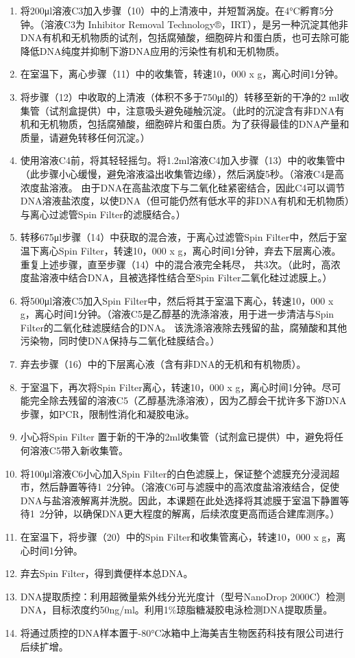 \begin{enumerate}
      \item 将200μl溶液C3加入步骤（10）中的上清液中，并短暂涡旋。在4°C孵育5分钟。（溶液C3为 Inhibitor Removal Technology®，IRT），是另一种沉淀其他非DNA有机和无机物质的试剂，包括腐殖酸，细胞碎片和蛋白质，也可去除可能降低DNA纯度并抑制下游DNA应用的污染性有机和无机物质。
      \item 在室温下，离心步骤（11）中的收集管，转速10，000 x g，离心时间1分钟。
      \item 将步骤（12）中收取的上清液（体积不多于750μl的）转移至新的干净的2 ml收集管（试剂盒提供）中，注意吸头避免碰触沉淀。（此时的沉淀含有非DNA有机和无机物质，包括腐殖酸，细胞碎片和蛋白质。为了获得最佳的DNA产量和质量，请避免转移任何沉淀。）
      \item 使用溶液C4前，将其轻轻摇匀。将1.2ml溶液C4加入步骤（13）中的收集管中（此步骤小心缓慢，避免溶液溢出收集管边缘），然后涡旋5秒。（溶液C4是高浓度盐溶液。 由于DNA在高盐浓度下与二氧化硅紧密结合，因此C4可以调节DNA溶液盐浓度，以使DNA（但可能仍然有低水平的非DNA有机和无机物质）与离心过滤管Spin Filter的滤膜结合。）
      \item 转移675μl步骤（14）中获取的混合液，于离心过滤管Spin Filter中，然后于室温下离心Spin Filter，转速10，000 x g，离心时间1分钟，弃去下层离心液。重复上述步骤，直至步骤（14）中的混合液完全耗尽， 共3次。（此时，高浓度盐溶液中结合DNA，且被选择性结合至Spin Filter二氧化硅过滤膜上。）
      \item 将500μl溶液C5加入Spin Filter中，然后将其于室温下离心，转速10，000 x g，离心时间1分钟。（溶液C5是乙醇基的洗涤溶液，用于进一步清洁与Spin Filter的二氧化硅滤膜结合的DNA。 该洗涤溶液除去残留的盐，腐殖酸和其他污染物，同时使DNA保持与二氧化硅膜结合。）
      \item 弃去步骤（16）中的下层离心液（含有非DNA的无机和有机物质）。
      \item 于室温下，再次将Spin Filter离心，转速10，000 x g，离心时间1分钟。尽可能完全除去残留的溶液C5（乙醇基洗涤溶液），因为乙醇会干扰许多下游DNA步骤，如PCR，限制性消化和凝胶电泳。
      \item 小心将Spin Filter 置于新的干净的2ml收集管（试剂盒已提供）中，避免将任何溶液C5带入新收集管。
      \item 将100μl溶液C6小心加入Spin Filter的白色滤膜上，保证整个滤膜充分浸润超市，然后静置等待1~2分钟。（溶液C6可与滤膜中的高浓度盐溶液结合，促使DNA与盐溶液解离并洗脱。因此，本课题在此处选择将其滤膜于室温下静置等待1~2分钟，以确保DNA更大程度的解离，后续浓度更高而适合建库测序。）
      \item 在室温下，将步骤（20）中的Spin Filter和收集管离心，转速10，000 x g，离心时间1分钟。
      \item 弃去Spin Filter，得到粪便样本总DNA。
      \item DNA提取质控：利用超微量紫外线分光光度计（型号NanoDrop 2000C）检测DNA，目标浓度约50ng/ml。利用1\%琼脂糖凝胶电泳检测DNA提取质量。
      \item 将通过质控的DNA样本置于-80°C冰箱中上海美吉生物医药科技有限公司进行后续扩增。
    \end{enumerate}

